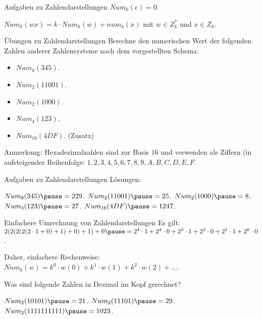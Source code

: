 \begin{frame}{Aufgaben zu Zahlendarstellungen}
	$Num_k(\epsilon) = 0$.
	
	$Num_k(wx) = k \cdot Num_k(w) + num_k(x)$ mit $w \in Z_k^*$ und $x \in Z_k$.
	
	\begin{taskblock}{Übungen zu Zahlendarstellungen}
		Berechne den numerischen Wert der folgenden Zahlen anderer Zahlensysteme nach dem vorgestellten Schema:
		\begin{itemize}
			\item $Num_8(345)$.
			\item $Num_2(11001)$.
			\item $Num_2(1000)$.
			\item $Num_4(123)$.
			\item $Num_{16}(4DF)$. (Zusatz)
		\end{itemize}
	\end{taskblock}

	Anmerkung: Hexadezimalzahlen sind zur Basis $16$ und verwenden als Ziffern (in aufsteigender Reihenfolge: $1, 2, 3, 4, 5, 6, 7, 8, 9, A, B, C, D, E, F$.
\end{frame}

\begin{frame}{Aufgaben zu Zahlendarstellungen}
	\pause Lösungen:
	\begin{itemize}
		\pitem $Num_8(345) \p = 229$.
		\pitem $Num_2(11001) \p = 25$.
		\pitem $Num_2(1000) \p = 8$.
		\pitem $Num_4(123) \p = 27$.
		\pitem $Num_{16}(4DF) \p = 1247$. 
	\end{itemize}
\end{frame}

\begin{frame}{Einfachere Umrechnung von Zahlendarstellungen}
	Es gilt: $2(2(2(2(2 \cdot 1 + 0)+1)+0)+1)+0 \p = 2^4 \cdot 1 + 2^4 \cdot 0 + 2^3 \cdot 1 + 2^2 \cdot 0 + 2^1 \cdot 1 + 2^0 \cdot 0$.
	
	\p Daher, einfachere Rechenweise: $Num_k(w) = k^0 \cdot w(0) + k^1 \cdot w(1) + k^2 \cdot w(2) + ...$.
	
	\p Was sind folgende Zahlen in Dezimal im Kopf gerechnet?
	
	\begin{itemize}
		\pitem $Num_2(10101) \p = 21$.
		\pitem $Num_2(11101) \p = 29$.
		\pitem $Num_2(1111111111) \p = 1023$.
	\end{itemize}
	
\end{frame}
		
